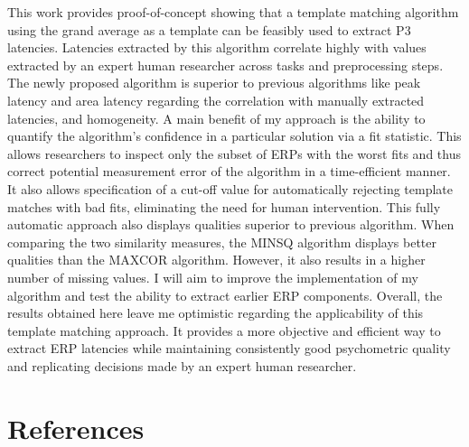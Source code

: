 \documentclass[
  man]{apa7}
\begin{document}
This work provides proof-of-concept showing that a template matching algorithm using the grand average as a template can be feasibly used to extract P3 latencies. Latencies extracted by this algorithm correlate highly with values extracted by an expert human researcher across tasks and preprocessing steps. The newly proposed algorithm is superior to previous algorithms like peak latency and area latency regarding the correlation with manually extracted latencies, and homogeneity. A main benefit of my approach is the ability to quantify the algorithm's confidence in a particular solution via a fit statistic. This allows researchers to inspect only the subset of ERPs with the worst fits and thus correct potential measurement error of the algorithm in a time-efficient manner. It also allows specification of a cut-off value for automatically rejecting template matches with bad fits, eliminating the need for human intervention. This fully automatic approach also displays qualities superior to previous algorithm. When comparing the two similarity measures, the MINSQ algorithm displays better qualities than the MAXCOR algorithm. However, it also results in a higher number of missing values. I will aim to improve the implementation of my algorithm and test the ability to extract earlier ERP components. Overall, the results obtained here leave me optimistic regarding the applicability of this template matching approach. It provides a more objective and efficient way to extract ERP latencies while maintaining consistently good psychometric quality and replicating decisions made by an expert human researcher.

\newpage

\hypertarget{references}{%
\section{References}\label{references}}
\end{document}
